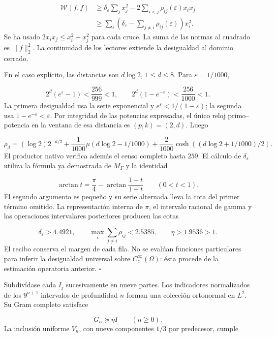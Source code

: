 \[
\begin{aligned}
\mathscr W(f,f)&\geq
\delta_\varepsilon\sum_jx_j^2
-2\sum_{i<j}\rho_{ij}(\varepsilon)x_ix_j\\
&\geq\sum_i\left(\delta_\varepsilon-
\sum_{j\neq i}\rho_{ij}(\varepsilon)\right)x_i^2.
\end{aligned}
\]
Se ha usado \(2x_ix_j\leq x_i^2+x_j^2\) para cada cruce. La suma de las normas al cuadrado es \(\|f\|_2^2\). La continuidad de los lectores extiende la desigualdad al dominio cerrado.

En el caso explícito, las distancias son \(d\log2\), \(1\leq d\leq8\). Para \(\varepsilon=1/1000\),

\[
2^d(e^\varepsilon-1)<\frac{256}{999}<1,
\qquad 2^d(1-e^{-\varepsilon})<\frac{256}{1000}<1.
\]
La primera desigualdad usa la serie exponencial y \(e^\varepsilon<1/(1-\varepsilon)\); la segunda usa \(1-e^{-\varepsilon}<\varepsilon\). Por integridad de las potencias expresadas, el único reloj primo–potencia en la ventana de esa distancia es \((p,k)=(2,d)\). Luego

\[
\rho_d=(\log2)2^{-d/2}
+\frac1{1000}\mu(d\log2-1/1000)
+\frac2{1000}\cosh((d\log2+1/1000)/2).
\]
El productor nativo verifica además el censo completo hasta \(259\). El cálculo de \(\delta_\varepsilon\) utiliza la fórmula ya demostrada de \(M_\Gamma\) y la identidad

\[
\arctan t=\frac\pi4-
\arctan\frac{1-t}{1+t}\qquad(0<t<1).
\]
El segundo argumento es pequeño y su serie alternada lleva la cota del primer término omitido. La representación interna de \(\pi\), el intervalo racional de gamma y las operaciones intervalares posteriores producen las cotas

\[
\delta_\varepsilon>4.4921,\qquad
\max_i\sum_{j\neq i}\rho_{ij}<2.5385,\qquad
\eta>1.9536>1.
\]
El recibo conserva el margen de cada fila. No se evalúan funciones particulares para inferir la desigualdad universal sobre \(C_c^\infty(\Omega)\): ésta procede de la estimación operatoria anterior. \hfill\(\square\)

Subdivídase cada \(I_j\) sucesivamente en nueve partes. Los indicadores normalizados de los \(9^{n+1}\) intervalos de profundidad \(n\) forman una colección ortonormal en \(L^2\). Su Gram completo satisface

\[
G_n\succeq\eta I\qquad(n\geq0).
\]
La inclusión uniforme \(V_n\), con nueve componentes \(1/3\) por predecesor, cumple

